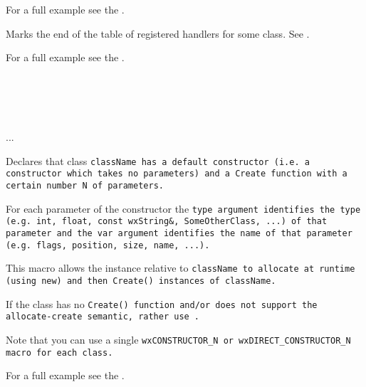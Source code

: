 For a full example see the .


\label{wxendhandlerstable}


Marks the end of the table of registered handlers for some class.
See .

For a full example see the .


\label{wxconstructorn}

\\
\\
\\
\\
...\\

Declares that class \tt{className} has a default constructor (i.e. a constructor which takes
no parameters) and a \tt{Create} function with a certain number \tt{N} of parameters. 

For each parameter of the constructor the \tt{type} argument identifies the type (e.g.
\tt{int}, \tt{float}, \tt{const wxString&}, \tt{SomeOtherClass}, ...) of that parameter
and the \tt{var} argument identifies the name of that parameter (e.g. \tt{flags}, \tt{position},
\tt{size}, \tt{name}, ...).

This macro allows the  instance relative to
\tt{className} to allocate at runtime (using \tt{new}) and then \tt{Create()} 
instances of \tt{className}.

If the class has no \tt{Create()} function and/or does not support the allocate-create
semantic, rather use .

Note that you can use a single \tt{wxCONSTRUCTOR\_N} or \tt{wxDIRECT\_CONSTRUCTOR\_N} macro
for each class.

For a full example see the .


\label{wxdirectconstructorn}

